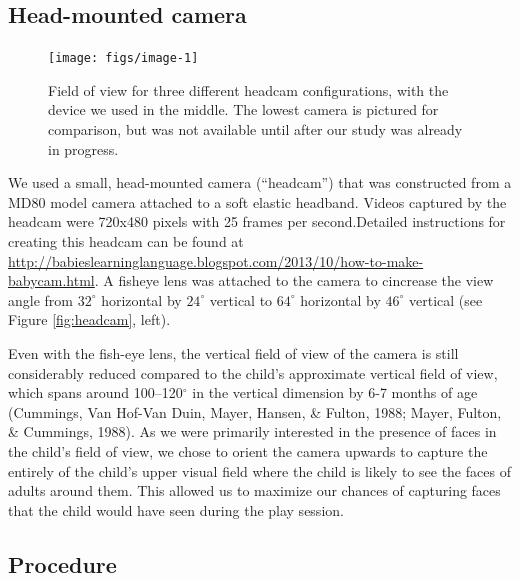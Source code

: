 \documentclass[10pt, letterpaper]{article}
\newenvironment{CodeChunk}{}{}
\begin{document}
\subsection{Head-mounted camera}\label{head-mounted-camera}

\begin{CodeChunk}
\begin{figure}[H]

{\centering \texttt{[image: figs/image-1]} 

}

\caption[Field of view for three different headcam configurations, with the device we used in the middle]{Field of view for three different headcam configurations, with the device we used in the middle. The lowest camera is pictured for comparison, but was not available until after our study was already in progress.}\label{fig:image}
\end{figure}
\end{CodeChunk}

We used a small, head-mounted camera (``headcam'') that was constructed
from a MD80 model camera attached to a soft elastic headband. Videos
captured by the headcam were 720x480 pixels with 25 frames per
second.Detailed instructions for creating this headcam can be found at
\url{http://babieslearninglanguage.blogspot.com/2013/10/how-to-make-babycam.html}.
A fisheye lens was attached to the camera to cincrease the view angle
from \(32^{\circ}\) horizontal by \(24^{\circ}\) vertical to
\(64^{\circ}\) horizontal by \(46^{\circ}\) vertical (see Figure
\ref{fig:headcam}, left).

Even with the fish-eye lens, the vertical field of view of the camera is
still considerably reduced compared to the child's approximate vertical
field of view, which spans around 100--120\(^{\circ}\) in the vertical
dimension by 6-7 months of age (Cummings, Van Hof-Van Duin, Mayer,
Hansen, \& Fulton, 1988; Mayer, Fulton, \& Cummings, 1988). As we were
primarily interested in the presence of faces in the child's field of
view, we chose to orient the camera upwards to capture the entirely of
the child's upper visual field where the child is likely to see the
faces of adults around them. This allowed us to maximize our chances of
capturing faces that the child would have seen during the play session.

\subsection{Procedure}\label{procedure}
\end{document}
